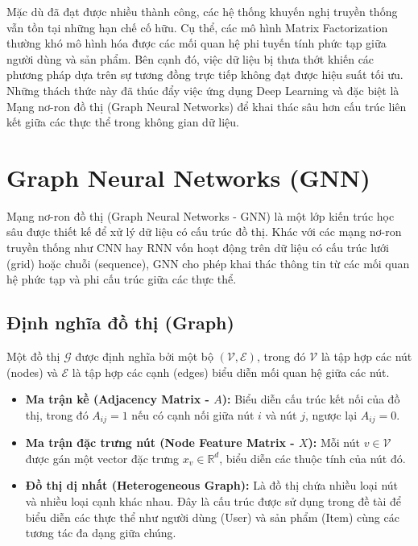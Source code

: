 Mặc dù đã đạt được nhiều thành công, các hệ thống khuyến nghị truyền thống vẫn tồn tại những hạn chế cố hữu. Cụ thể, các mô hình Matrix Factorization thường khó mô hình hóa được các mối quan hệ phi tuyến tính phức tạp giữa người dùng và sản phẩm. Bên cạnh đó, việc dữ liệu bị thưa thớt khiến các phương pháp dựa trên sự tương đồng trực tiếp không đạt được hiệu suất tối ưu. Những thách thức này đã thúc đẩy việc ứng dụng Deep Learning và đặc biệt là Mạng nơ-ron đồ thị (Graph Neural Networks) để khai thác sâu hơn cấu trúc liên kết giữa các thực thể trong không gian dữ liệu.

\section{Graph Neural Networks (GNN)}

Mạng nơ-ron đồ thị (Graph Neural Networks - GNN) là một lớp kiến trúc học sâu được thiết kế để xử lý dữ liệu có cấu trúc đồ thị. Khác với các mạng nơ-ron truyền thống như CNN hay RNN vốn hoạt động trên dữ liệu có cấu trúc lưới (grid) hoặc chuỗi (sequence), GNN cho phép khai thác thông tin từ các mối quan hệ phức tạp và phi cấu trúc giữa các thực thể.

\subsection{Định nghĩa đồ thị (Graph)}

Một đồ thị $\mathcal{G}$ được định nghĩa bởi một bộ $(\mathcal{V}, \mathcal{E})$, trong đó $\mathcal{V}$ là tập hợp các nút (nodes) và $\mathcal{E}$ là tập hợp các cạnh (edges) biểu diễn mối quan hệ giữa các nút.
\begin{itemize}
    \item \textbf{Ma trận kề (Adjacency Matrix - $A$):} Biểu diễn cấu trúc kết nối của đồ thị, trong đó $A_{ij} = 1$ nếu có cạnh nối giữa nút $i$ và nút $j$, ngược lại $A_{ij} = 0$.
    \item \textbf{Ma trận đặc trưng nút (Node Feature Matrix - $X$):} Mỗi nút $v \in \mathcal{V}$ được gán một vector đặc trưng $x_v \in \mathbb{R}^d$, biểu diễn các thuộc tính của nút đó.
    \item \textbf{Đồ thị dị nhất (Heterogeneous Graph):} Là đồ thị chứa nhiều loại nút và nhiều loại cạnh khác nhau. Đây là cấu trúc được sử dụng trong đề tài để biểu diễn các thực thể như người dùng (User) và sản phẩm (Item) cùng các tương tác đa dạng giữa chúng.
\end{itemize}

